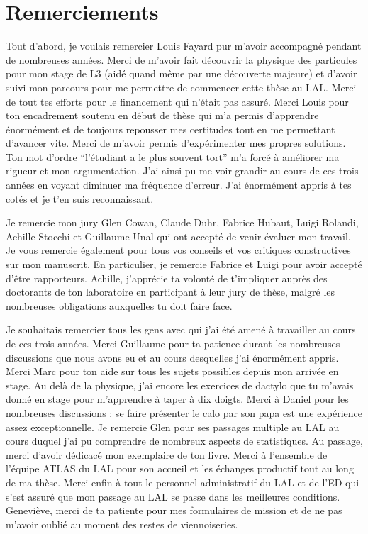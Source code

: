 \section*{Remerciements}

Tout d'abord, je voulais remercier Louis Fayard pur m'avoir accompagné pendant de nombreuses années.
Merci de m'avoir fait découvrir la physique des particules pour mon stage de L3 (aidé quand même par une découverte majeure) et d'avoir suivi mon parcours pour me  permettre de commencer cette thèse au LAL.
Merci de tout tes efforts pour le financement qui n'était pas assuré.
Merci Louis pour ton encadrement soutenu en début de thèse qui m'a permis d'apprendre énormément et de toujours repousser mes certitudes tout en me permettant d'avancer vite.
Merci de m'avoir permis d'expérimenter mes propres solutions.
Ton mot d'ordre ``l'étudiant a le plus souvent tort'' m'a forcé à améliorer ma rigueur et mon argumentation.
J'ai ainsi pu me voir grandir au cours de ces trois années en voyant diminuer ma fréquence d'erreur.
J'ai énormément appris à tes cotés et je t'en suis reconnaissant.

Je remercie mon jury Glen Cowan, Claude Duhr, Fabrice Hubaut, Luigi Rolandi, Achille Stocchi et Guillaume Unal qui ont accepté de venir évaluer mon travail.
Je vous remercie également pour tous vos conseils et vos critiques constructives sur mon manuscrit.
En particulier, je remercie Fabrice et Luigi pour avoir accepté d'être rapporteurs.
Achille, j'apprécie ta volonté de t'impliquer auprès des doctorants de ton laboratoire en participant à leur jury de thèse, malgré les nombreuses obligations auxquelles tu doit faire face.


Je souhaitais remercier tous les gens avec qui j'ai été amené à travailler au cours de ces trois années.
Merci Guillaume pour ta patience durant les nombreuses discussions que nous avons eu et au cours desquelles j'ai énormément appris.
Merci Marc pour ton aide sur tous les sujets possibles depuis mon arrivée en stage.
Au delà de la physique, j'ai encore les exercices de dactylo que tu m'avais donné en stage pour m'apprendre à taper à dix doigts.
Merci à Daniel pour les nombreuses discussions : se faire présenter le calo par son papa est une expérience assez exceptionnelle.
Je remercie Glen pour ses passages multiple au LAL au cours duquel j'ai pu comprendre de nombreux aspects de statistiques.
Au passage, merci d'avoir dédicacé mon exemplaire de ton livre.
Merci à l'ensemble de l'équipe ATLAS du LAL pour son accueil et les échanges productif tout au long de ma thèse.
Merci enfin à tout le personnel administratif du LAL et de l'ED qui s'est assuré que mon passage au LAL se passe dans les meilleures conditions.
Geneviève, merci de ta patiente pour mes formulaires de mission et de ne pas m'avoir oublié au moment des restes de viennoiseries.

